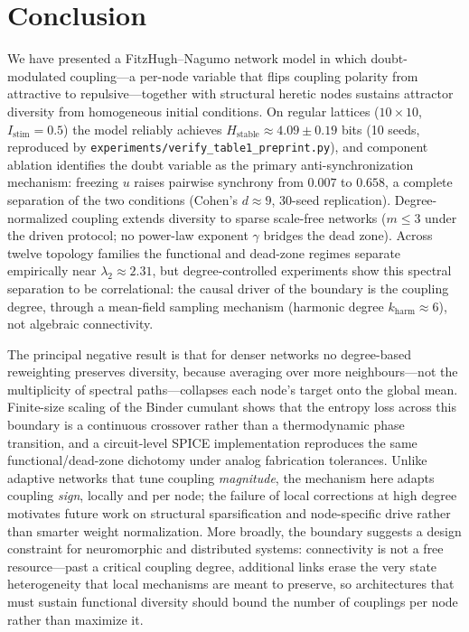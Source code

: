 ﻿\documentclass[11pt]{article}
\begin{document}
\section{Conclusion}

We have presented a FitzHugh--Nagumo network model in which doubt-modulated coupling---a per-node variable that flips coupling polarity from attractive to repulsive---together with structural heretic nodes sustains attractor diversity from homogeneous initial conditions. On regular lattices ($10\times10$, $I_{\text{stim}}=0.5$) the model reliably achieves $H_{\text{stable}} \approx 4.09 \pm 0.19$ bits (10 seeds, reproduced by \texttt{experiments/verify\_table1\_preprint.py}), and component ablation identifies the doubt variable as the primary anti-synchronization mechanism: freezing $u$ raises pairwise synchrony from $0.007$ to $0.658$, a complete separation of the two conditions (Cohen's $d \approx 9$, 30-seed replication). Degree-normalized coupling extends diversity to sparse scale-free networks ($m \leq 3$ under the driven protocol; no power-law exponent $\gamma$ bridges the dead zone). Across twelve topology families the functional and dead-zone regimes separate empirically near $\lambda_2 \approx 2.31$, but degree-controlled experiments show this spectral separation to be correlational: the causal driver of the boundary is the coupling degree, through a mean-field sampling mechanism (harmonic degree $k_{\mathrm{harm}} \approx 6$), not algebraic connectivity.

The principal negative result is that for denser networks no degree-based reweighting preserves diversity, because averaging over more neighbours---not the multiplicity of spectral paths---collapses each node's target onto the global mean. Finite-size scaling of the Binder cumulant shows that the entropy loss across this boundary is a continuous crossover rather than a thermodynamic phase transition, and a circuit-level SPICE implementation reproduces the same functional/dead-zone dichotomy under analog fabrication tolerances. Unlike adaptive networks that tune coupling \emph{magnitude}, the mechanism here adapts coupling \emph{sign}, locally and per node; the failure of local corrections at high degree motivates future work on structural sparsification and node-specific drive rather than smarter weight normalization. More broadly, the boundary suggests a design constraint for neuromorphic and distributed systems: connectivity is not a free resource---past a critical coupling degree, additional links erase the very state heterogeneity that local mechanisms are meant to preserve, so architectures that must sustain functional diversity should bound the number of couplings per node rather than maximize it.
\end{document}
